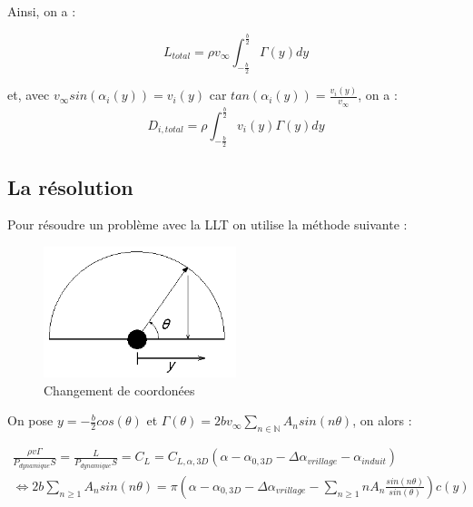 Ainsi, on a :

\begin{equation}
    L_{total} = \rho v_{\infty} \int_{-\frac{b}{2}}^{\frac{b}{2}} \Gamma(y) dy
\end{equation}

et, avec $v_{\infty} sin(\alpha_i(y)) = v_i(y)$ car $tan(\alpha_i(y)) = \frac{v_i(y)}{v_{\infty}}$, on a :
\begin{equation}
    D_{i,total} = \rho \int_{-\frac{b}{2}}^{\frac{b}{2}} v_{i}(y)\Gamma(y) dy
\end{equation}

\subsection{La résolution} 
\label{subsec:Ch1.1.1}

Pour résoudre un problème avec la LLT on utilise la méthode suivante : 

\begin{figure}[H]
    \centering
    \includegraphics[width=0.5\textwidth]{Pics/01 - Basses Fidélités/Prandtl-lifting-line-coordinate-change.png}  
    \caption{Changement de coordonées}
    \label{fig:llt fchange coord}
\end{figure}

On pose $y = -\frac{b}{2}cos(\theta)$ et $\Gamma(\theta) = 2bv_{\infty} \sum_{n \in \mathbb{N}}^{} A_n sin(n\theta)$, on alors :

\begin{equation}
    \begin{split}
        \frac{\rho v \Gamma}{P_{dynamique} S} = \frac{L}{P_{dynamique} S} = C_L = C_{L,\alpha,3D}(\alpha - \alpha_{0,3D} - \Delta\alpha_{vrillage} - \alpha_{induit}) \\
        \Leftrightarrow 2b\sum_{n \geq 1}^{} A_n sin(n\theta) = \pi (\alpha - \alpha_{0,3D} - \Delta\alpha_{vrillage} - \sum_{n \geq 1}^{}n A_n \frac{sin(n\theta)}{sin(\theta)})c(y)
    \end{split}
    \label{eq: LLT}
\end{equation}

